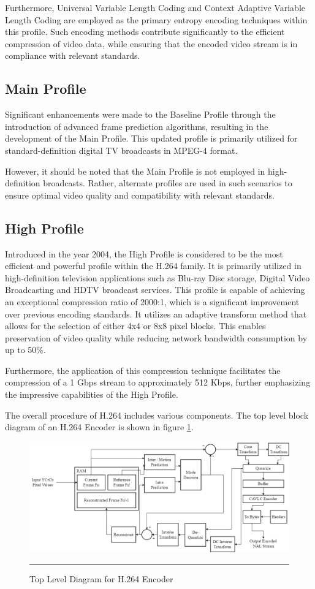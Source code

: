 Furthermore, Universal Variable Length Coding and Context Adaptive Variable Length Coding  are employed as the primary entropy encoding techniques within this profile. Such encoding methods contribute significantly to the efficient compression of video data, while ensuring that the encoded video stream is in compliance with relevant standards. 

\subsection{Main Profile}
Significant enhancements were made to the Baseline Profile through the introduction of advanced frame prediction algorithms, resulting in the development of the Main Profile. This updated profile is primarily utilized for standard-definition digital TV broadcasts in MPEG-4 format.

However, it should be noted that the Main Profile is not employed in high-definition broadcasts. Rather, alternate profiles are used in such scenarios to ensure optimal video quality and compatibility with relevant standards.

\subsection{High Profile}
Introduced in the year 2004, the High Profile is considered to be the most efficient and powerful profile within the H.264 family. It is primarily utilized in high-definition television applications such as Blu-ray Disc storage, Digital Video Broadcasting and HDTV broadcast services. This profile is capable of achieving an exceptional compression ratio of 2000:1, which is a significant improvement over previous encoding standards. It utilizes an adaptive transform method that allows for the selection of either 4x4 or 8x8 pixel blocks. This enables preservation of video quality while reducing network bandwidth consumption by up to 50$\%$.

Furthermore, the application of this compression technique facilitates the compression of a 1 Gbps stream to approximately 512 Kbps, further emphasizing the impressive capabilities of the High Profile.

The overall procedure of H.264 includes various components. The top level block diagram of an H.264 Encoder is shown in figure \ref{fig:toplevel}.

\begin{figure}[H]
	\centering
	\includegraphics[width = 5in]{./Figures/topbd.png}
	\rule{35em}{0.5pt}
	\caption{Top Level Diagram for H.264 Encoder}
	\label{fig:toplevel}
\end{figure}


